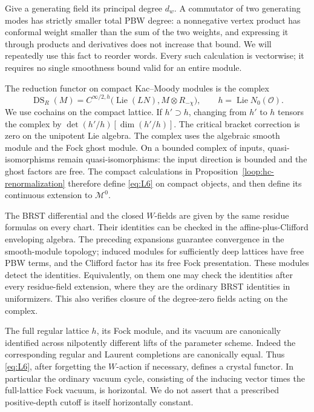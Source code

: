 \documentclass[11pt]{article}
\numberwithin{equation}{section}
\theoremstyle{definition}
\theoremstyle{remark}
\begin{document}
Give a generating field its principal degree \(d_w\).  A commutator
of two generating modes has strictly smaller total PBW degree: a
nonnegative vertex product has conformal weight smaller than the sum
of the two weights, and expressing it through products and derivatives
does not increase that bound.  We will repeatedly use this fact to
reorder words.  Every such calculation is vectorwise; it requires no
single smoothness bound valid for an entire module.

The reduction functor on compact Kac--Moody modules is the complex
\begin{equation}\label{eq:L6}
 \operatorname{DS}_R(M)=
 C^{\infty/2,h}\bigl(\operatorname{Lie}(LN),M\otimes R_{-\chi}\bigr),
 \qquad h=\operatorname{Lie}N_0(\mathcal O).
\end{equation}
We use cochains on the compact lattice.  If \(h'\supset h\),
changing from \(h'\) to \(h\) tensors the complex by
\(\det(h'/h)[\dim(h'/h)]\).  The critical bracket correction is zero
on the unipotent Lie algebra.  The complex uses the algebraic smooth
module and the Fock ghost module.  On a bounded complex of inputs,
quasi-isomorphisms remain quasi-isomorphisms: the input direction is
bounded and the ghost factors are free.  The compact calculations in
Proposition~\ref{loop:hc-renormalization} therefore define
\eqref{eq:L6} on compact objects, and then define its continuous
extension to \(\mathcal M^0\).

The BRST differential and the closed \(W\)-fields are given by the
same residue formulas on every chart.  Their identities can be
checked in the affine-plus-Clifford enveloping algebra.  The preceding
expansions guarantee convergence in the smooth-module topology;
induced modules for sufficiently deep lattices have free PBW terms,
and the Clifford factor has its free Fock presentation.  These
modules detect the identities.  Equivalently, on them one may check
the identities after every residue-field extension, where they are
the ordinary BRST identities in uniformizers.  This also verifies
closure of the degree-zero fields acting on the complex.

The full regular lattice \(h\), its Fock module, and its vacuum are
canonically identified across nilpotently different lifts of the
parameter scheme.  Indeed the corresponding regular and Laurent
completions are canonically equal.  Thus \eqref{eq:L6}, after forgetting
the \(W\)-action if necessary, defines a crystal functor.  In
particular the ordinary vacuum cycle, consisting of the inducing
vector times the full-lattice Fock vacuum, is horizontal.  We do not
assert that a prescribed positive-depth cutoff is itself horizontally
constant.
\end{document}
